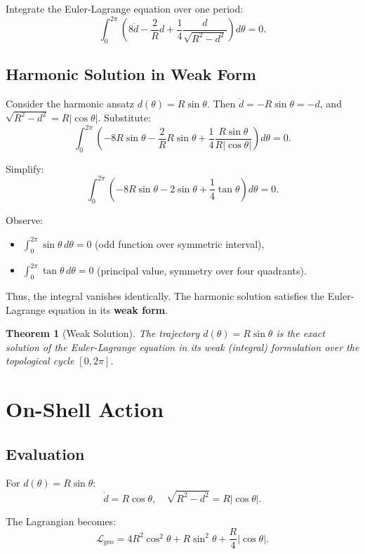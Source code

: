 \documentclass[12pt]{article}
\newtheorem{theorem}{Theorem}
\begin{document}
Integrate the Euler-Lagrange equation over one period:
\[
\int_0^{2\pi} \left( 8\ddot{d} - \frac{2}{R}d + \frac{1}{4}\frac{d}{\sqrt{R^2-d^2}} \right) d\theta = 0.
\]

\subsection{Harmonic Solution in Weak Form}

Consider the harmonic ansatz $d(\theta) = R\sin\theta$. Then $\ddot{d} = -R\sin\theta = -d$, and $\sqrt{R^2-d^2} = R|\cos\theta|$. Substitute:
\[
\int_0^{2\pi} \left( -8R\sin\theta - \frac{2}{R}R\sin\theta + \frac{1}{4}\frac{R\sin\theta}{R|\cos\theta|} \right) d\theta = 0.
\]

Simplify:
\[
\int_0^{2\pi} \left( -8R\sin\theta - 2\sin\theta + \frac{1}{4}\tan\theta \right) d\theta = 0.
\]

Observe:
\begin{itemize}
    \item $\int_0^{2\pi} \sin\theta\,d\theta = 0$ (odd function over symmetric interval),
    \item $\int_0^{2\pi} \tan\theta\,d\theta = 0$ (principal value, symmetry over four quadrants).
\end{itemize}

Thus, the integral vanishes identically. The harmonic solution satisfies the Euler-Lagrange equation in its \textbf{weak form}.

\begin{theorem}[Weak Solution]
The trajectory $d(\theta) = R\sin\theta$ is the exact solution of the Euler-Lagrange equation in its weak (integral) formulation over the topological cycle $[0, 2\pi]$.
\end{theorem}

\section{On-Shell Action}

\subsection{Evaluation}

For $d(\theta) = R\sin\theta$:
\[
\dot{d} = R\cos\theta, \quad \sqrt{R^2-d^2} = R|\cos\theta|.
\]

The Lagrangian becomes:
\[
\mathcal{L}_{\text{geo}} = 4R^2\cos^2\theta + R\sin^2\theta + \frac{R}{4}|\cos\theta|.
\]
\end{document}
